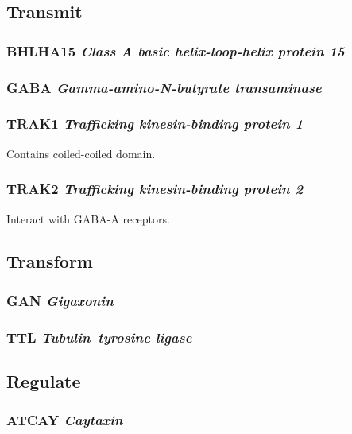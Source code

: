 \subsection{Transmit}

\subsubsection{BHLHA15 \textit{Class A basic helix-loop-helix protein 15}}

\subsubsection{GABA \textit{Gamma-amino-N-butyrate transaminase}}

\subsubsection{TRAK1 \textit{Trafficking kinesin-binding protein 1}}

Contains coiled-coiled domain.

\subsubsection{TRAK2 \textit{Trafficking kinesin-binding protein 2}}

Interact with GABA-A receptors.

\subsection{Transform}

\subsubsection{GAN \textit{Gigaxonin}}

\subsubsection{TTL \textit{Tubulin--tyrosine ligase}}

\subsection{Regulate}

\subsubsection{ATCAY \textit{Caytaxin}}


